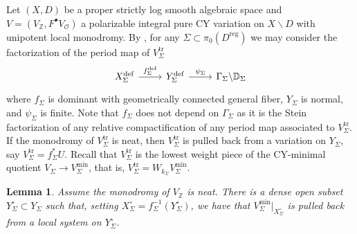 \documentclass{amsart}
\newcommand{\bs}{\backslash}
\newtheorem{lem}[theorem]{Lemma}
\theoremstyle{definition}
\theoremstyle{remark}
\def\bD{\mathbb{D}}
\def\bZ{\mathbb{Z}}
\def\cO{\mathcal{O}}
\def\define{\mathrm{def}}
\def\reg{\mathrm{reg}}
\def\trans{\mathrm{tr}}
\numberwithin{equation}{section}
\begin{document}
Let $(X,D)$ be a proper strictly log smooth algebraic space and $V=(V_\bZ,F^\bullet V_\cO)$ a polarizable integral pure CY variation on $X\bs D$ with unipotent local monodromy.  By \cite{BBT23}, for any $\Sigma\subset\pi_0(D^\reg)$
we may consider the factorization of the period map of $V^\trans_\Sigma$
\[\begin{tikzcd}
X_\Sigma^\define\ar[r,"f_\Sigma^\define"]&Y_\Sigma^\define\ar[r,"\psi_\Sigma"]&\Gamma_\Sigma\backslash \bD_\Sigma
\end{tikzcd}\]
where $f_\Sigma$ is dominant with geometrically connected general fiber, $Y_\Sigma$ is normal, and $\psi_\Sigma$ is finite. Note that $f_\Sigma$ does not depend on $\Gamma_\Sigma$ as it is the Stein factorization of any relative compactification of any period map associated to $V^\trans_\Sigma$.  If the monodromy of $V^\trans_\Sigma$ is neat, then $V^\trans_\Sigma$ is pulled back from a variation on $Y_\Sigma$, say $V^\trans_\Sigma=f_\Sigma^*U$.  Recall that $V^\trans_\Sigma$ is the lowest weight piece of the CY-minimal quotient $V_\Sigma\to V_\Sigma^\mathrm{min}$, that is, $V_\Sigma^\trans=W_{k_\Sigma}V^\mathrm{min}_\Sigma$.

 
\begin{lem}\label{lem:tr split}  Assume the monodromy of $V_\bZ$ is neat.  There is a dense open subset $Y_\Sigma^\circ\subset Y_\Sigma$ such that, setting $X_\Sigma^\circ=f_\Sigma^{-1}(Y_\Sigma^\circ)$, we have that $V_\Sigma^\mathrm{min}|_{X_\Sigma^\circ}$ is pulled back from a local system on $Y_\Sigma^\circ$. 
\end{lem}
\end{document}
